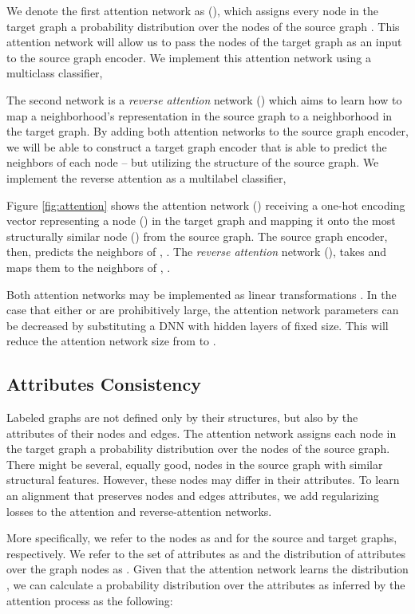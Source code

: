 \documentclass[sigconf]{acmart}
\begin{document}
We denote the first attention network as (), which assigns every node in the target graph  a probability distribution over the nodes of the source graph .
This attention network will allow us to pass the nodes of the target graph as an input to the source graph encoder.
We implement this attention network using a multiclass classifier,

The second network is a \emph{reverse attention} network () which aims to learn how to map a neighborhood's representation in the source graph to a neighborhood in the target graph.
By adding both attention networks to the source graph encoder, we will be able to construct a target graph encoder that is able to predict the neighbors of each node -- but utilizing the structure of the source graph.
We implement the reverse attention as a multilabel classifier,

Figure \ref{fig:attention} shows the attention network () receiving a one-hot encoding vector representing a node () in the target graph and mapping it onto the most structurally similar node () from the source graph.
The source graph encoder, then, predicts the neighbors of , .
The \emph{reverse attention} network (), takes  and maps them to the neighbors of , .


Both attention networks may be implemented as linear transformations .
In the case that either  or  are prohibitively large, the attention network parameters can be decreased by substituting a DNN with hidden layers of fixed size.
This will reduce the attention network size from  to .

\subsection{Attributes Consistency}
\label{sec:attributes}
Labeled graphs are not defined only by their structures, but also by the attributes of their nodes and edges.
The attention network assigns each node in the target graph a probability distribution over the nodes of the source graph.
There might be several, equally good, nodes in the source graph with similar structural features.
However, these nodes may differ in their attributes.
To learn an alignment that preserves nodes and edges attributes, we add regularizing losses to the attention and reverse-attention networks.

More specifically, we refer to the nodes as  and  for the source and target graphs, respectively.
We refer to the set of attributes as  and the distribution of attributes over the graph nodes as .
Given that the attention network  learns the distribution ,
we can calculate a probability distribution over the attributes as inferred by the attention process as the following:
\end{document}
